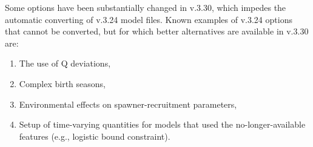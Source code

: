 \noindent Some options have been substantially changed in v.3.30, which impedes the automatic converting of v.3.24 model files. Known examples of v.3.24 options that cannot be converted, but for which better alternatives are available in v.3.30 are:
\begin{enumerate}
	\item The use of Q deviations,
	\item Complex birth seasons,
	\item Environmental effects on spawner-recruitment parameters,
	\item Setup of time-varying quantities for models that used the no-longer-available features (e.g., logistic bound constraint).\end{enumerate}

\pagebreak
